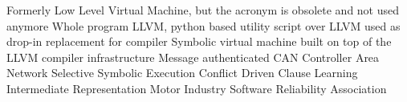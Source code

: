   {Formerly Low Level Virtual Machine, but the acronym
               is obsolete and not used anymore}
 {Whole program LLVM, python based utility script over LLVM
               used as drop-in replacement for compiler}
  {Symbolic virtual machine built on top of the LLVM compiler
               infrastructure}
 {Message authenticated CAN}
 {Controller Area Network}
 {Selective Symbolic Execution}
 {Conflict Driven Clause Learning}
 {Intermediate Representation}
 {Motor Industry Software Reliability Association}
